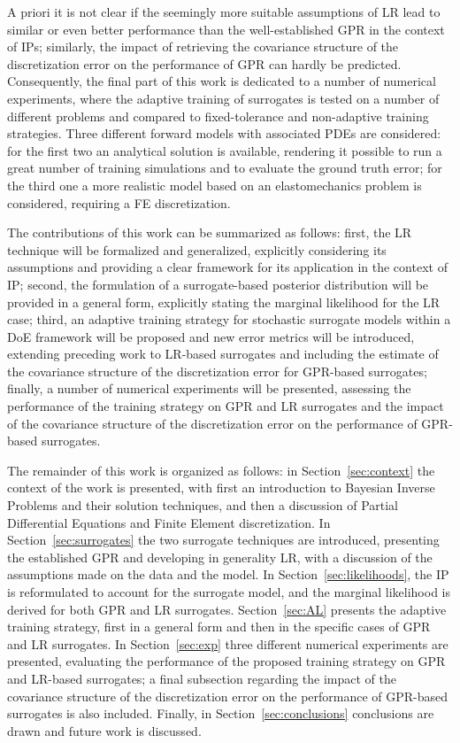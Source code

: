 A priori it is not clear if the seemingly more suitable assumptions of LR lead to similar or even better performance than the well-established GPR in the context of IPs; similarly, the impact of retrieving the covariance structure of the discretization error on the performance of GPR can hardly be predicted.
Consequently, the final part of this work is dedicated to a number of numerical experiments, where the adaptive training of surrogates is tested on a number of different problems and compared to fixed-tolerance and non-adaptive training strategies.
Three different forward models with associated PDEs are considered: for the first two an analytical solution is available, rendering it possible to run a great number of training simulations and to evaluate the ground truth error; for the third one a more realistic model based on an elastomechanics problem is considered, requiring a FE discretization.\medskip

The contributions of this work can be summarized as follows: first, the LR technique will be formalized and generalized, explicitly considering its assumptions and providing a clear framework for its application in the context of IP; second, the formulation of a surrogate-based posterior distribution will be provided in a general form, explicitly stating the marginal likelihood for the LR case; third, an adaptive training strategy for stochastic surrogate models within a DoE framework will be proposed and new error metrics will be introduced, extending preceding work to LR-based surrogates and including the estimate of the covariance structure of the discretization error for GPR-based surrogates; finally, a number of numerical experiments will be presented, assessing the performance of the training strategy on GPR and LR surrogates and the impact of the covariance structure of the discretization error on the performance of GPR-based surrogates.\medskip

The remainder of this work is organized as follows: in Section~\ref{sec:context} the context of the work is presented, with first an introduction to Bayesian Inverse Problems and their solution techniques, and then a discussion of Partial Differential Equations and Finite Element discretization.
In Section~\ref{sec:surrogates} the two surrogate techniques are introduced, presenting the established GPR and developing in generality LR, with a discussion of the assumptions made on the data and the model.
In Section~\ref{sec:likelihoods}, the IP is reformulated to account for the surrogate model, and the marginal likelihood is derived for both GPR and LR surrogates.
Section~\ref{sec:AL} presents the adaptive training strategy, first in a general form and then in the specific cases of GPR and LR surrogates.
In Section~\ref{sec:exp} three different numerical experiments are presented, evaluating the performance of the proposed training strategy on GPR and LR-based surrogates; a final subsection regarding the impact of the covariance structure of the discretization error on the performance of GPR-based surrogates is also included.
Finally, in Section~\ref{sec:conclusions} conclusions are drawn and future work is discussed.

